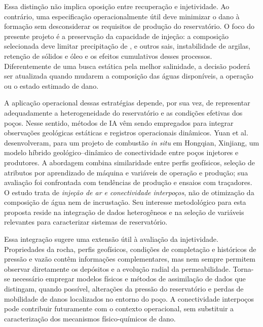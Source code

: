 \documentclass[10pt,a4paper]{article}
\begin{document}
Essa distinção não implica oposição entre recuperação e injetividade. Ao contrário, uma especificação operacionalmente útil deve minimizar o dano à formação sem desconsiderar os requisitos de produção do reservatório. O foco do presente projeto é a preservação da capacidade de injeção: a composição selecionada deve limitar precipitação de ,  e outros sais, instabilidade de argilas, retenção de sólidos e óleo e os efeitos cumulativos desses processos. Diferentemente de uma busca estática pela melhor salinidade, a decisão poderá ser atualizada quando mudarem a composição das águas disponíveis, a operação ou o estado estimado de dano.

A aplicação operacional dessas estratégias depende, por sua vez, de representar adequadamente a heterogeneidade do reservatório e as condições efetivas dos poços. Nesse sentido, métodos de IA vêm sendo empregados para integrar observações geológicas estáticas e registros operacionais dinâmicos. Yuan et al. \cite{yuan2026connectivity} desenvolveram, para um projeto de combustão \textit{in situ} em Hongqian, Xinjiang, um modelo híbrido geológico--dinâmico de conectividade entre poços injetores e produtores. A abordagem combina similaridade entre perfis geofísicos, seleção de atributos por aprendizado de máquina e variáveis de operação e produção; sua avaliação foi confrontada com tendências de produção e ensaios com traçadores. O estudo trata de \emph{injeção de ar e conectividade interpoços}, não de otimização da composição de água nem de incrustação. Seu interesse metodológico para esta proposta reside na integração de dados heterogêneos e na seleção de variáveis relevantes para caracterizar sistemas de reservatório.

Essa integração sugere uma extensão útil à avaliação da injetividade. Propriedades da rocha, perfis geofísicos, condições de completação e históricos de pressão e vazão contêm informações complementares, mas nem sempre permitem observar diretamente os depósitos e a evolução radial da permeabilidade. Torna-se necessário empregar modelos físicos e métodos de assimilação de dados que distingam, quando possível, alterações da pressão do reservatório e perdas de mobilidade de danos localizados no entorno do poço. A conectividade interpoços pode contribuir futuramente com o contexto operacional, sem substituir a caracterização dos mecanismos físico-químicos de dano.
\end{document}
